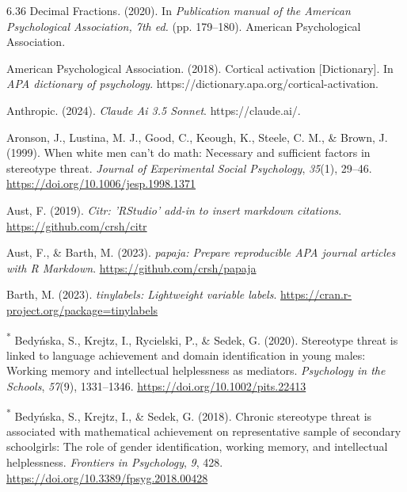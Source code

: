 \documentclass[
  stu,floatsintext]{apa7}
\newlength{\cslhangindent}
\newenvironment{CSLReferences}[2] %
 {\begin{list}{}{%
  \setlength{\itemindent}{0pt}
  \setlength{\leftmargin}{0pt}
  \setlength{\parsep}{0pt}
  \ifodd #1
   \setlength{\leftmargin}{\cslhangindent}
   \setlength{\itemindent}{-1\cslhangindent}
  \fi
  \setlength{\itemsep}{#2\baselineskip}}}
 {\end{list}}
\begin{document}
\label{refs}
\begin{CSLReferences}{1}{0}
6.36 {Decimal Fractions}. (2020). In \emph{Publication manual of the {American Psychological Association}, 7th ed.} (pp. 179--180). American Psychological Association.

American Psychological Association. (2018). Cortical activation {[}Dictionary{]}. In \emph{APA dictionary of psychology}. https://dictionary.apa.org/cortical-activation.

Anthropic. (2024). \emph{Claude {Ai} 3.5 {Sonnet}}. https://claude.ai/.

Aronson, J., Lustina, M. J., Good, C., Keough, K., Steele, C. M., \& Brown, J. (1999). When white men can't do math: {Necessary} and sufficient factors in stereotype threat. \emph{Journal of Experimental Social Psychology}, \emph{35}(1), 29--46. \url{https://doi.org/10.1006/jesp.1998.1371}

Aust, F. (2019). \emph{Citr: 'RStudio' add-in to insert markdown citations}. \url{https://github.com/crsh/citr}

Aust, F., \& Barth, M. (2023). \emph{{papaja}: {Prepare} reproducible {APA} journal articles with {R Markdown}}. \url{https://github.com/crsh/papaja}

Barth, M. (2023). \emph{{tinylabels}: Lightweight variable labels}. \url{https://cran.r-project.org/package=tinylabels}

\textsuperscript{*} Bedyńska, S., Krejtz, I., Rycielski, P., \& Sedek, G. (2020). Stereotype threat is linked to language achievement and domain identification in young males: {Working} memory and intellectual helplessness as mediators. \emph{Psychology in the Schools}, \emph{57}(9), 1331--1346. \url{https://doi.org/10.1002/pits.22413}

\textsuperscript{*} Bedyńska, S., Krejtz, I., \& Sedek, G. (2018). Chronic stereotype threat is associated with mathematical achievement on representative sample of secondary schoolgirls: {The} role of gender identification, working memory, and intellectual helplessness. \emph{Frontiers in Psychology}, \emph{9}, 428. \url{https://doi.org/10.3389/fpsyg.2018.00428}


\end{CSLReferences}
\end{document}
